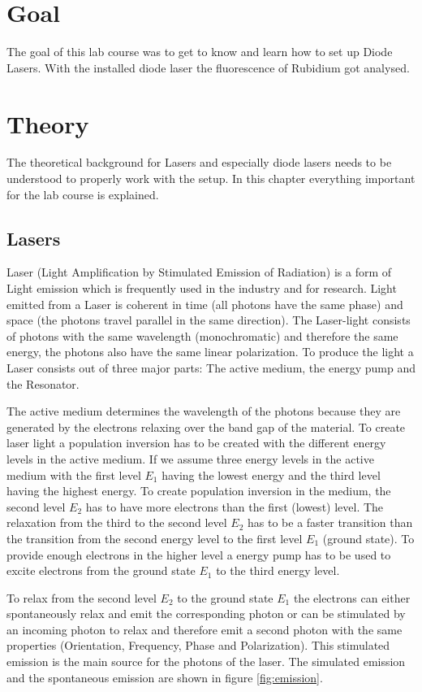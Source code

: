 \section*{Goal}
The goal of this lab course was to get to know and learn how to set up Diode Lasers.
With the installed diode laser the fluorescence of Rubidium got analysed.
\section{Theory}
\label{sec:theory}
The theoretical background for Lasers and especially diode lasers needs to be understood to properly work with the setup.
In this chapter everything important for the lab course is explained.
\subsection{Lasers}
Laser (Light Amplification by Stimulated Emission of Radiation) is a form of Light emission which is frequently used in the industry and for research.
Light emitted from a Laser is coherent in time (all photons have the same phase) and space (the photons travel parallel in the same direction).
The Laser-light consists of photons with the same wavelength (monochromatic) and therefore the same energy, the photons also have the same linear polarization.
To produce the light a Laser consists out of three major parts: The active medium, the energy pump and the Resonator.

The active medium determines the wavelength of the photons because they are generated by the electrons relaxing over the band gap of the material.
To create laser light a population inversion has to be created with the different energy levels in the active medium.
If we assume three energy levels in the active medium with the first level $E_1$ having the lowest energy and the third level having the highest energy.
To create population inversion in the medium, the second level $E_2$ has to have more electrons than the first (lowest) level.
The relaxation from the third to the second level $E_2$ has to be a faster transition than the transition from the second energy level to the first level $E_1$ (ground state).
To provide enough electrons in the higher level a energy pump has to be used to excite electrons from the ground state $E_1$ to the third energy level.

To relax from the second level $E_2$ to the ground state $E_1$ the electrons can either spontaneously relax and emit the corresponding photon or can be stimulated by an incoming photon to relax and therefore emit a second photon with the same properties (Orientation, Frequency, Phase and Polarization).
This stimulated emission is the main source for the photons of the laser.
The simulated emission and the spontaneous emission are shown in figure \ref{fig:emission}.

